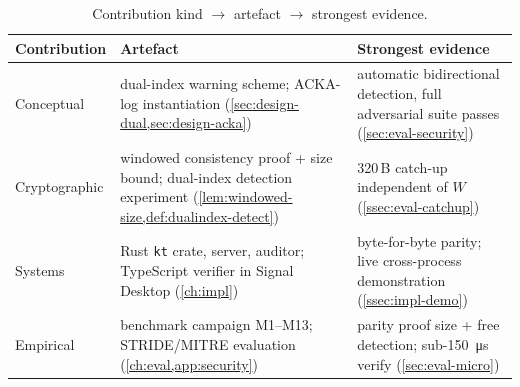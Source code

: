 \begin{table}[ht]
\centering
\caption{Contribution kind $\to$ artefact $\to$ strongest evidence.}
\label{tab:trace-contrib}
\footnotesize
\begin{tabular}{@{}p{2.1cm}p{6.0cm}p{4.6cm}@{}}
\toprule
Contribution & Artefact & Strongest evidence \\
\midrule
Conceptual & dual-index warning scheme; ACKA-log instantiation (\cref{sec:design-dual,sec:design-acka}) & automatic bidirectional detection, full adversarial suite passes (\cref{sec:eval-security}) \\
Cryptographic & windowed consistency proof + size bound; dual-index detection experiment (\cref{lem:windowed-size,def:dualindex-detect}) & 320\,B catch-up independent of $W$ (\cref{ssec:eval-catchup}) \\
Systems & Rust \texttt{kt} crate, server, auditor; TypeScript verifier in Signal Desktop (\cref{ch:impl}) & byte-for-byte parity; live cross-process demonstration (\cref{ssec:impl-demo}) \\
Empirical & benchmark campaign M1--M13; STRIDE/MITRE evaluation (\cref{ch:eval,app:security}) & parity proof size + free detection; sub-\SI{150}{\micro\second} verify (\cref{sec:eval-micro}) \\
\bottomrule
\end{tabular}
\end{table}
